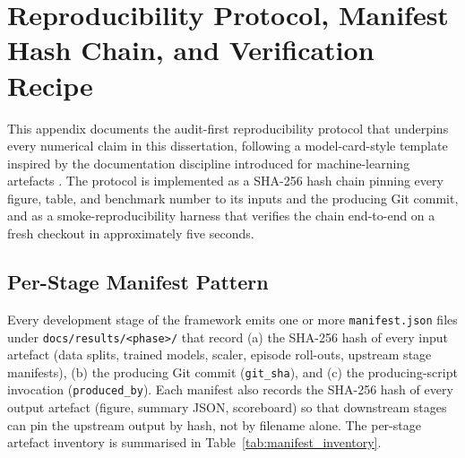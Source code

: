 
\chapter{Reproducibility Protocol, Manifest Hash Chain, and Verification Recipe}\label{app:repro}

This appendix documents the audit-first reproducibility protocol that underpins every numerical claim in this dissertation, following a model-card-style template inspired by the documentation discipline introduced for machine-learning artefacts \cite{Mitchell2019}. The protocol is implemented as a SHA-256 hash chain pinning every figure, table, and benchmark number to its inputs and the producing Git commit, and as a smoke-reproducibility harness that verifies the chain end-to-end on a fresh checkout in approximately five seconds.

\section{Per-Stage Manifest Pattern}\label{app:manifest_pattern}
Every development stage of the framework emits one or more \texttt{manifest.json} files under \texttt{docs/results/<phase>/} that record (a) the SHA-256 hash of every input artefact (data splits, trained models, scaler, episode roll-outs, upstream stage manifests), (b) the producing Git commit (\texttt{git\_sha}), and (c) the producing-script invocation (\texttt{produced\_by}). Each manifest also records the SHA-256 hash of every output artefact (figure, summary JSON, scoreboard) so that downstream stages can pin the upstream output by hash, not by filename alone. The per-stage artefact inventory is summarised in Table~\ref{tab:manifest_inventory}.


